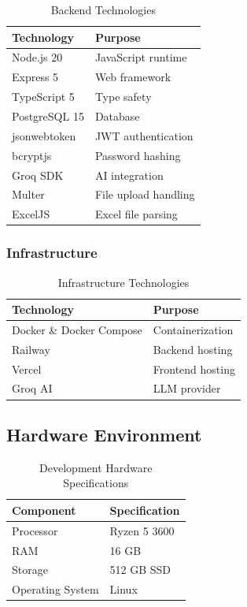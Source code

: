 \documentclass[12pt,a4paper]{report}
\begin{document}
\begin{table}[H]
\centering
\begin{tabular}{|l|l|}
\hline
\textbf{Technology} & \textbf{Purpose} \\
\hline
Node.js 20 & JavaScript runtime \\
Express 5 & Web framework \\
TypeScript 5 & Type safety \\
PostgreSQL 15 & Database \\
jsonwebtoken & JWT authentication \\
bcryptjs & Password hashing \\
Groq SDK & AI integration \\
Multer & File upload handling \\
ExcelJS & Excel file parsing \\
\hline
\end{tabular}
\caption{Backend Technologies}
\end{table}

\subsubsection{Infrastructure}

\begin{table}[H]
\centering
\begin{tabular}{|l|l|}
\hline
\textbf{Technology} & \textbf{Purpose} \\
\hline
Docker \& Docker Compose & Containerization \\
Railway & Backend hosting \\
Vercel & Frontend hosting \\
Groq AI & LLM provider \\
\hline
\end{tabular}
\caption{Infrastructure Technologies}
\end{table}

\subsection{Hardware Environment}

\begin{table}[H]
\centering
\begin{tabular}{|l|l|}
\hline
\textbf{Component} & \textbf{Specification} \\
\hline
Processor & Ryzen 5 3600 \\
RAM & 16 GB \\
Storage & 512 GB SSD \\
Operating System & Linux \\
\hline
\end{tabular}
\caption{Development Hardware Specifications}
\end{table}
\end{document}
